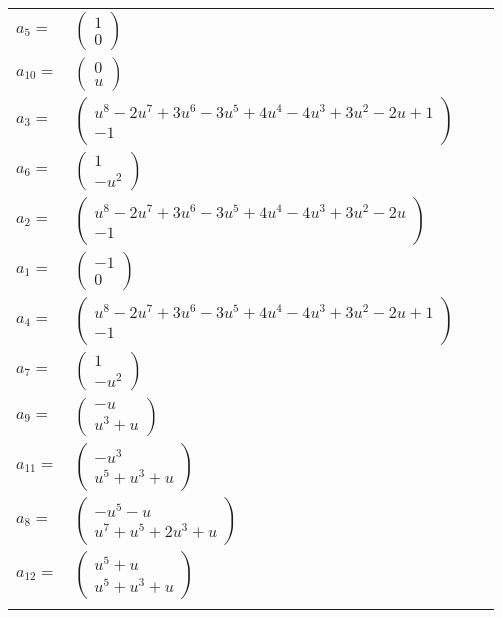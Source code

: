 \documentclass[1p]{elsarticle_modified}
\theoremstyle{definition}
\begin{document}
\begin{tabular}{m{7pt} m{180pt} m{7pt} m{180pt} }
\flushright $a_{5}=$&$\begin{pmatrix}1\\0\end{pmatrix}$ \\
\flushright $a_{10}=$&$\begin{pmatrix}0\\u\end{pmatrix}$ \\
\flushright $a_{3}=$&$\begin{pmatrix}u^8-2 u^7+3 u^6-3 u^5+4 u^4-4 u^3+3 u^2-2 u+1\\-1\end{pmatrix}$ \\
\flushright $a_{6}=$&$\begin{pmatrix}1\\- u^2\end{pmatrix}$ \\
\flushright $a_{2}=$&$\begin{pmatrix}u^8-2 u^7+3 u^6-3 u^5+4 u^4-4 u^3+3 u^2-2 u\\-1\end{pmatrix}$ \\
\flushright $a_{1}=$&$\begin{pmatrix}-1\\0\end{pmatrix}$ \\
\flushright $a_{4}=$&$\begin{pmatrix}u^8-2 u^7+3 u^6-3 u^5+4 u^4-4 u^3+3 u^2-2 u+1\\-1\end{pmatrix}$ \\
\flushright $a_{7}=$&$\begin{pmatrix}1\\- u^2\end{pmatrix}$ \\
\flushright $a_{9}=$&$\begin{pmatrix}- u\\u^3+u\end{pmatrix}$ \\
\flushright $a_{11}=$&$\begin{pmatrix}- u^3\\u^5+u^3+u\end{pmatrix}$ \\
\flushright $a_{8}=$&$\begin{pmatrix}- u^5- u\\u^7+u^5+2 u^3+u\end{pmatrix}$ \\
\flushright $a_{12}=$&$\begin{pmatrix}u^5+u\\u^5+u^3+u\end{pmatrix}$\\&\end{tabular}
\end{document}
